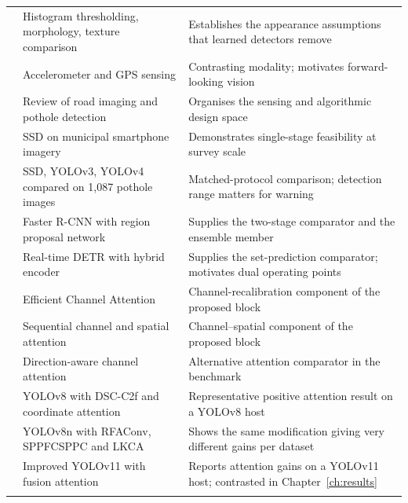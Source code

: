 \documentclass[MScCS]{uccthesis}
\begin{document}
\begin{xltabular}{\textwidth}{@{}>{\raggedright\arraybackslash}p{3.4cm}
                                 >{\raggedright\arraybackslash}p{3.6cm}
                                 >{\raggedright\arraybackslash}X@{}}
\textcite{koch2011pothole}
   & Histogram thresholding, morphology, texture comparison
   & Establishes the appearance assumptions that learned detectors remove \\
\addlinespace[3pt]
\textcite{eriksson2008pothole}
   & Accelerometer and GPS sensing
   & Contrasting modality; motivates forward-looking vision \\
\addlinespace[3pt]
\textcite{ma2022computer}
   & Review of road imaging and pothole detection
   & Organises the sensing and algorithmic design space \\
\addlinespace[3pt]
\textcite{maeda2018road}
   & SSD on municipal smartphone imagery
   & Demonstrates single-stage feasibility at survey scale \\
\addlinespace[3pt]
\textcite{alshaghouri2021realtime}
   & SSD, YOLOv3, YOLOv4 compared on 1,087 pothole images
   & Matched-protocol comparison; detection range matters for warning \\
\addlinespace[3pt]
\textcite{ren2015faster}
   & Faster R-CNN with region proposal network
   & Supplies the two-stage comparator and the ensemble member \\
\addlinespace[3pt]
\textcite{zhao2024rtdetr}
   & Real-time DETR with hybrid encoder
   & Supplies the set-prediction comparator; motivates dual operating points \\
\addlinespace[3pt]
\textcite{wang2020eca}
   & Efficient Channel Attention
   & Channel-recalibration component of the proposed block \\
\addlinespace[3pt]
\textcite{woo2018cbam}
   & Sequential channel and spatial attention
   & Channel--spatial component of the proposed block \\
\addlinespace[3pt]
\textcite{hou2021coordinate}
   & Direction-aware channel attention
   & Alternative attention comparator in the benchmark \\
\addlinespace[3pt]
\textcite{pei2024yolordd}
   & YOLOv8 with DSC-C2f and coordinate attention
   & Representative positive attention result on a YOLOv8 host \\
\addlinespace[3pt]
\textcite{chen2024lrsyolo}
   & YOLOv8n with RFAConv, SPPFCSPPC and LKCA
   & Shows the same modification giving very different gains per dataset \\
\addlinespace[3pt]
\textcite{zhang2025automatic}
   & Improved YOLOv11 with fusion attention
   & Reports attention gains on a YOLOv11 host; contrasted in Chapter~\ref{ch:results} \\
\addlinespace[3pt]
\textcite{youwai2024yolo9tr}

\end{xltabular}
\end{document}
